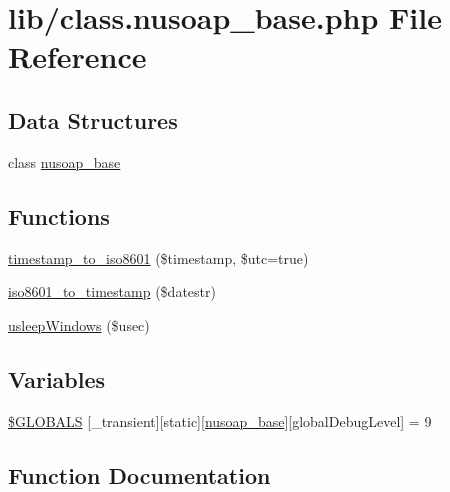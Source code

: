 \hypertarget{class_8nusoap__base_8php}{}\section{lib/class.nusoap\+\_\+base.\+php File Reference}
\label{class_8nusoap__base_8php}
\subsection*{Data Structures}
\begin{DoxyCompactItemize}
\item 
class \hyperlink{classnusoap__base}{nusoap\+\_\+base}
\end{DoxyCompactItemize}
\subsection*{Functions}
\begin{DoxyCompactItemize}
\item 
\hyperlink{class_8nusoap__base_8php_ae9aac88f9bf83be961dd47d1b78b90d3}{timestamp\+\_\+to\+\_\+iso8601} (\$timestamp, \$utc=true)
\item 
\hyperlink{class_8nusoap__base_8php_a7458f4fe2e94892e63804807994fb5b9}{iso8601\+\_\+to\+\_\+timestamp} (\$datestr)
\item 
\hyperlink{class_8nusoap__base_8php_a0405bf74776f57039c31a3f01fd48a29}{usleep\+Windows} (\$usec)
\end{DoxyCompactItemize}
\subsection*{Variables}
\begin{DoxyCompactItemize}
\item 
\hyperlink{class_8nusoap__base_8php_a8581b61f0ccce82123a43934d044f729}{\$\+G\+L\+O\+B\+A\+L\+S} \mbox{[}\textquotesingle{}\+\_\+transient\textquotesingle{}\mbox{]}\mbox{[}\textquotesingle{}static\textquotesingle{}\mbox{]}\mbox{[}\textquotesingle{}\hyperlink{classnusoap__base}{nusoap\+\_\+base}\textquotesingle{}\mbox{]}\mbox{[}\textquotesingle{}global\+Debug\+Level\textquotesingle{}\mbox{]} = 9
\end{DoxyCompactItemize}


\subsection{Function Documentation}
\hypertarget{class_8nusoap__base_8php_a7458f4fe2e94892e63804807994fb5b9}{}
